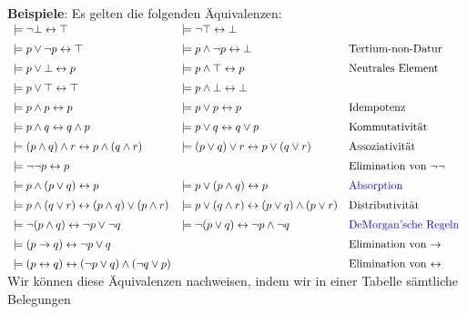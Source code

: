 \noindent
\textbf{Beispiele}:  Es gelten die folgenden Äquivalenzen: \\[0.3cm]
\hspace*{0.3cm} 
$\begin{array}{lll}
\models \neg \bot \leftrightarrow \top & \models \neg \top \leftrightarrow \bot &  \\[0.2cm]
 \models p \vee   \neg p \leftrightarrow \top & \models p \wedge \neg p \leftrightarrow \bot & \mbox{Tertium-non-Datur} \\[0.2cm]
 \models p \vee   \bot \leftrightarrow p & \models p \wedge \top  \leftrightarrow p & \mbox{Neutrales Element}\\[0.2cm]
 \models p \vee   \top  \leftrightarrow \top & \models p \wedge \bot \leftrightarrow \bot &  \\[0.2cm]
 \models p \wedge p \leftrightarrow p  & \models p \vee p \leftrightarrow p &  \mbox{Idempotenz} \\[0.2cm]
 \models p \wedge q \leftrightarrow q \wedge p & \models p \vee   q \leftrightarrow q \vee p & \mbox{Kommutativität} \\[0.2cm]
 \models (p \wedge q) \wedge r \leftrightarrow p \wedge (q \wedge r) & \models (p \vee   q) \vee r \leftrightarrow p \vee   (q \vee r)  &
 \mbox{Assoziativität} \\[0.2cm]
 \models \neg \neg p \leftrightarrow p & & \mbox{Elimination von $\neg \neg$} \\[0.2cm]
 \models p \wedge (p \vee q)   \leftrightarrow p & \models p \vee   (p \wedge q) \leftrightarrow p &  \mbox{{\color{blue}Absorption}} \\[0.2cm]
 \models p \wedge (q \vee r)   \leftrightarrow (p \wedge q) \vee   (p \wedge r) & 
 \models p \vee   (q \wedge r) \leftrightarrow (p \vee q)   \wedge (p \vee   r) & \mbox{Distributivität} \\[0.2cm]
 \models \neg (p \wedge q) \leftrightarrow  \neg p \vee   \neg q &  \models \neg (p \vee   q) \leftrightarrow  \neg p \wedge \neg q &
 \mbox{{\color{blue}DeMorgan'sche Regeln}}  \\[0.2cm]
 \models (p \rightarrow q) \leftrightarrow \neg p \vee q & &  \mbox{Elimination von $\rightarrow$} \\[0.2cm]
 \models (p \leftrightarrow q) \leftrightarrow (\neg p \vee q) \wedge (\neg q \vee p) & & \mbox{Elimination von $\leftrightarrow$}
\end{array}$ \\[0.3cm]
Wir können diese Äquivalenzen nachweisen, indem wir in einer Tabelle sämtliche Belegungen
